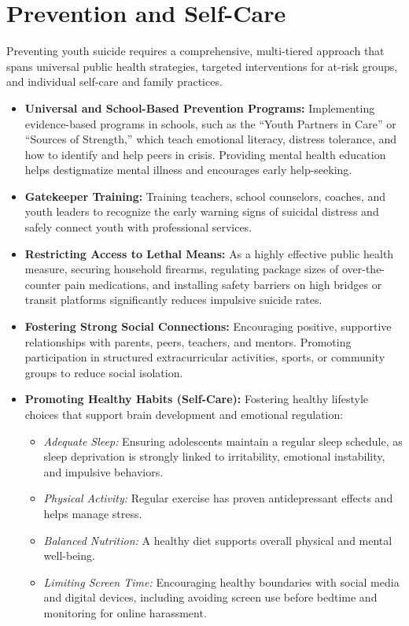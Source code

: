 \section*{Prevention and Self-Care}
Preventing youth suicide requires a comprehensive, multi-tiered approach that spans universal public health strategies, targeted interventions for at-risk groups, and individual self-care and family practices.
\begin{itemize}
    \item \textbf{Universal and School-Based Prevention Programs:} Implementing evidence-based programs in schools, such as the ``Youth Partners in Care'' or ``Sources of Strength,'' which teach emotional literacy, distress tolerance, and how to identify and help peers in crisis. Providing mental health education helps destigmatize mental illness and encourages early help-seeking.
    \item \textbf{Gatekeeper Training:} Training teachers, school counselors, coaches, and youth leaders to recognize the early warning signs of suicidal distress and safely connect youth with professional services.
    \item \textbf{Restricting Access to Lethal Means:} As a highly effective public health measure, securing household firearms, regulating package sizes of over-the-counter pain medications, and installing safety barriers on high bridges or transit platforms significantly reduces impulsive suicide rates.
    \item \textbf{Fostering Strong Social Connections:} Encouraging positive, supportive relationships with parents, peers, teachers, and mentors. Promoting participation in structured extracurricular activities, sports, or community groups to reduce social isolation.
    \item \textbf{Promoting Healthy Habits (Self-Care):} Fostering healthy lifestyle choices that support brain development and emotional regulation:
    \begin{itemize}
        \item \textit{Adequate Sleep:} Ensuring adolescents maintain a regular sleep schedule, as sleep deprivation is strongly linked to irritability, emotional instability, and impulsive behaviors.
        \item \textit{Physical Activity:} Regular exercise has proven antidepressant effects and helps manage stress.
        \item \textit{Balanced Nutrition:} A healthy diet supports overall physical and mental well-being.
        \item \textit{Limiting Screen Time:} Encouraging healthy boundaries with social media and digital devices, including avoiding screen use before bedtime and monitoring for online harassment.

\end{itemize}
\end{itemize}
